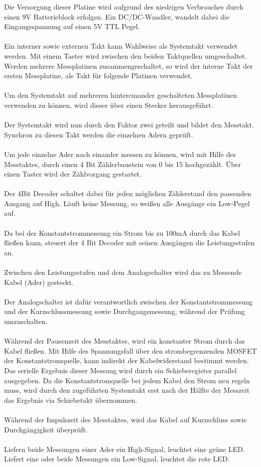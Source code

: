 Die Versorgung dieser Platine wird aufgrund des niedrigen Verbrauches durch einen 9V Batterieblock erfolgen. Ein DC/DC-Wandler, wandelt dabei die Eingangsspannung auf einen 5V TTL Pegel. 
\\
\\
Ein interner sowie externen Takt kann Wahlweise als Systemtakt verwendet werden. Mit einem Taster wird zwischen den beiden Taktquellen umgeschaltet. Werden mehrere Messplatinen zusammengeschaltet, so wird der interne Takt der ersten Messplatine, als Takt für folgende Platinen verwendet. 
\\
\\
Um den Systemtakt auf mehreren hintereinander geschalteten Messplatinen verwenden zu können, wird dieser über einen Stecker herausgeführt.
\\
\\
Der Systemtakt wird nun durch den Faktor zwei geteilt und bildet den Messtakt. Synchron zu diesen Takt werden die einzelnen Adern geprüft.
\\
\\
Um jede einzelne Ader nach einander messen zu können, wird mit Hilfe des Messtaktes, durch einen 4 Bit Zählerbaustein von 0 bis 15 hochgezählt. Über einen Taster wird der Zählvorgang gestartet.
\\
\\
Der 4Bit Decoder schaltet dabei für jeden möglichen Zählerstand den passenden Ausgang auf High. Läuft keine Messung, so weißen alle Ausgänge ein Low-Pegel auf. 
\\
\\
Da bei der Konstantstrommessung ein Strom bis zu 100mA durch das Kabel fließen kann, steuert der 4 Bit Decoder mit seinen Ausgängen die Leistungsstufen an.
\\
\\
Zwischen den Leistungsstufen und dem Analogschalter wird das zu Messende Kabel  (Ader) gesteckt. 
\\
\\
Der Analogschalter ist dafür verantwortlich zwischen der Konstantstrommessung und der Kurzschlussmessung sowie Durchgangsmessung, während der Prüfung umzuschalten. 
\\
\\
Während der Pausenzeit des Messtaktes, wird ein konstanter Strom durch das Kabel fließen. Mit Hilfe des Spannungsfall über den strombegrenzenden MOSFET der Konstantstromquelle, kann indirekt der Kabelwiderstand bestimmt werden. Das serielle Ergebnis dieser  Messung wird durch ein Schieberegister parallel ausgegeben. Da die Konstantstromquelle bei jedem Kabel den Strom neu regeln muss, wird durch den zugeführten Systemtakt erst nach der Hälfte der Messzeit das Ergebnis via Schiebetakt übernommen.
\\
\\
Während der Impulszeit des Messtaktes, wird das Kabel auf Kurzschluss sowie Durchgängigkeit überprüft. 
\\
\\
Liefern beide Messungen einer Ader ein High-Signal, leuchtet eine grüne LED. Liefert eine oder beide Messungen ein Low-Signal, leuchtet die rote LED.
